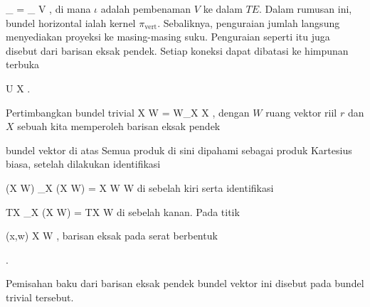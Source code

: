 \mavergleichskettedisp
{\vergleichskette
{ \pi_{ }  \circ \iota
}
{ =} {
_{  V  }
}
{ } {
}
{ } {
}
{ } {
}
}
{}{}{,}
di mana $\iota$ adalah pembenaman $V$ ke dalam $TE$. Dalam rumusan ini, bundel horizontal ialah kernel $\pi_{\text{vert}}$. Sebaliknya, penguraian jumlah langsung menyediakan proyeksi ke masing-masing suku. Penguraian seperti itu juga disebut  {} dari barisan eksak pendek. Setiap koneksi dapat dibatasi ke himpunan terbuka

\mavergleichskette
{\vergleichskette
{ U
}
{ \subseteq }{ X
}
{  }{
}
{    }{
}
{   }{
}
}
{}{}{.}

{

Pertimbangkan bundel trivial
 {X \times W = W_X } { X
} {,}
dengan $W$ ruang vektor riil
$r$ dan $X$ sebuah
kita memperoleh barisan eksak pendek

 {  }

bundel vektor di atas
Semua produk di sini dipahami sebagai produk Kartesius biasa, setelah dilakukan identifikasi

\mavergleichskette
{\vergleichskette
{ (X \times W) \times_X (X \times W)
}
{ = }{ X \times W \times W
}
{  }{
}
{    }{
}
{   }{
}
}
{}{}{}
di sebelah kiri serta identifikasi

\mavergleichskette
{\vergleichskette
{ TX \times_X (X \times W)
}
{ = }{ TX \times W
}
{  }{
}
{    }{
}
{   }{
}
}
{}{}{}
di sebelah kanan. Pada titik

\mavergleichskette
{\vergleichskette
{ (x,w)
}
{ \in }{ X \times W
}
{  }{
}
{    }{
}
{   }{
}
}
{}{}{,}
barisan eksak pada serat berbentuk

 { . }

Pemisahan baku dari barisan eksak pendek bundel vektor ini disebut  {} pada bundel trivial tersebut.

}

